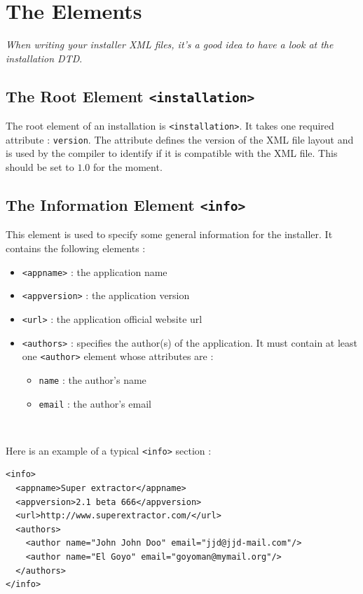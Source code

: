 \section{The \IzPack Elements}

\noindent
\textit{When writing your installer XML files, it's a good idea to have a look
at the \IzPack installation DTD}.\\

\subsection{The Root Element \texttt{<installation>}}

The root element of an installation is \texttt{<installation>}. It takes
one required attribute : \texttt{version}. The attribute defines the
version of the XML file layout and is used by the compiler to identify
if it is compatible with the XML file. This should be set to $1.0$ for
the moment.\\

\subsection{The Information Element \texttt{<info>}}

This element is used to specify some general information for the installer. It
contains the following elements :
\begin{itemize}

  \item \texttt{<appname>} : the application name
  \item \texttt{<appversion>} : the application version
  \item \texttt{<url>} : the application official website url
  \item \texttt{<authors>} : specifies the author(s) of the application. It must contain
  at least one \texttt{<author>} element whose attributes are :
  \begin{itemize}
    \item \texttt{name} : the author's name
    \item \texttt{email} : the author's email
  \end{itemize}

\end{itemize}\

Here is an example of a typical \texttt{<info>} section :\\
\footnotesize
\begin{verbatim}
<info>
  <appname>Super extractor</appname>
  <appversion>2.1 beta 666</appversion>
  <url>http://www.superextractor.com/</url>
  <authors>
    <author name="John John Doo" email="jjd@jjd-mail.com"/>
    <author name="El Goyo" email="goyoman@mymail.org"/>
  </authors>
</info>
\end{verbatim}
\normalsize

